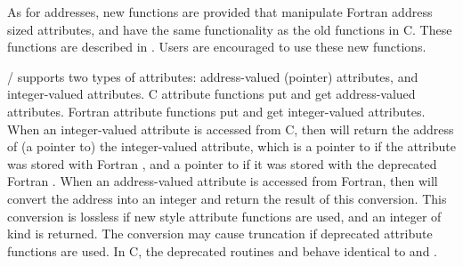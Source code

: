 As for addresses, new functions are provided that manipulate
Fortran address sized attributes, and have the same functionality as the
old
functions in C.  These functions are described in
.
Users are encouraged to use these new functions.


\MPI/ supports two types of attributes:  address-valued (pointer) attributes,
and integer-valued attributes.  C
attribute functions put and get address-valued
attributes.  Fortran attribute functions put and get integer-valued
attributes.  When an integer-valued attribute is accessed from
C,
then
will return the address of (a pointer to) the integer-valued
attribute, which is a pointer to
   if the attribute was stored with Fortran
%
  , and a pointer to  if it was
  stored with the deprecated Fortran .  When an
address-valued attribute is accessed from
%
Fortran, then 
will convert the address into an integer and
return the result of this conversion.  This conversion is lossless if new
style
attribute functions are used, and an integer of kind
is returned.  The conversion may cause truncation if
deprecated
attribute functions are used.
In C, the deprecated routines
%
   and  behave identical
%
  to  and .


